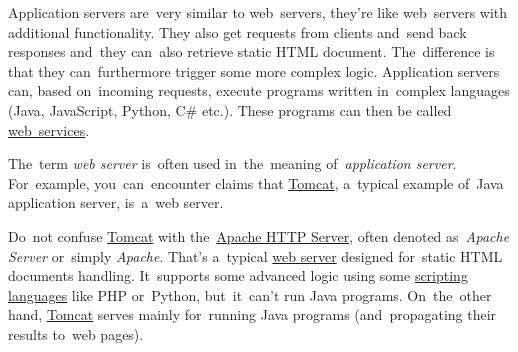 \label{applicationserver}
Application servers are~very similar to web~servers, they're like web~servers with additional functionality.
They also get requests from clients and~send back responses and~they can~also retrieve static HTML document.
The~difference is that they can~furthermore trigger some more complex logic.
Application servers can, based on~incoming requests, execute programs written in~complex languages (Java, JavaScript, Python, C\# etc.).
These programs can then be called \hyperref[webserviceapplication]{web~services}.

\warning The~term \textit{web server} is~often used in~the~meaning of~\textit{application server}.
For~example, you~can~encounter claims that \hyperref[tomcat]{Tomcat}, a~typical example of~Java application server, is~a~web server.

\warning Do~not confuse \hyperref[tomcat]{Tomcat} with the~\href{https://en.wikipedia.org/wiki/Apache_HTTP_Server}{Apache HTTP Server}, often denoted as~\textit{Apache Server} or~simply \textit{Apache}.
That's a~typical \hyperref[webserver]{web server} designed for~static HTML documents handling.
It~supports some advanced logic using some \hyperref[scriptinglanguages]{scripting languages} like PHP or~Python, but~it~can't run Java programs.
On~the~other hand, \hyperref[tomcat]{Tomcat} serves mainly for~running Java programs (and~propagating their results to~web pages).

\label{dns}
